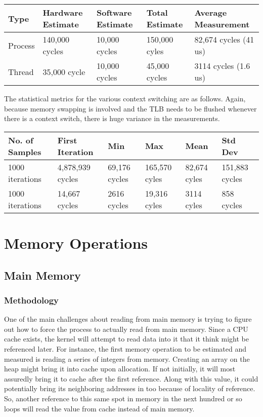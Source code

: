 \documentclass[paper=a4, fontsize=11pt]{scrartcl}
\numberwithin{equation}{section}        %
\numberwithin{figure}{section}          %
\numberwithin{table}{section}               %
\begin{document}
\begin{center}
    \begin{tabular}{ | l | l | l | l | l |}
    \hline
    Type & Hardware Estimate & Software Estimate & Total Estimate & Average Measurement \\      \hline
    Process & 140,000 cycles & 10,000 cycles & 150,000 cyles & 82,674 cycles (41 us) \\ 
    Thread & 35,000 cycle & 10,000 cycles & 45,000 cycles & 3114 cycles (1.6 us) \\
    \hline
    \end{tabular}
\end{center}

The statistical metrics for the various context switching are as follows.  Again, because memory swapping is involved and the TLB needs to be flushed whenever there is a context switch, there is huge variance in the measurements.

\begin{center}
    \begin{tabular}{ | l | l | l | l | l | l |}
    \hline
    No. of Samples & First Iteration & Min & Max & Mean & Std Dev \\ \hline
    1000 iterations & 4,878,939 cycles & 69,176 cycles & 165,570 cyles & 82,674 cyles & 151,883  cycles \\ 
    1000 iterations & 14,667 cycles & 2616 cycles & 19,316 cyles & 3114 cyles & 858 cycles \\ 
    \hline
    \end{tabular}
\end{center}

\section{Memory Operations}

\subsection{Main Memory}

\subsubsection{Methodology}

One of the main challenges about reading from main memory is trying to figure out how to force the process to actually read from main memory.  Since a CPU cache exists, the kernel will attempt to read data into it that it think might be referenced later.  For instance, the first memory operation to be estimated and measured is reading a series of integers from memory.  Creating an array on the heap might bring it into cache upon allocation.  If not initially, it will most assuredly bring it to cache after the first reference.  Along with this value, it could potentially bring its neighboring addresses in too because of locality of reference.  So, another reference to this same spot in memory in the next hundred or so loops will read the value from cache instead of main memory.
\end{document}

